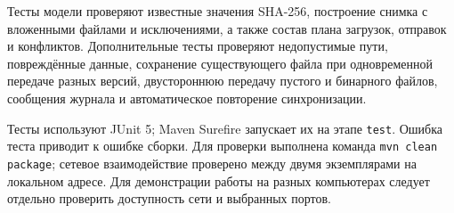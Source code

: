 \documentclass[12pt,a4paper]{article}
\begin{document}
Тесты модели проверяют известные значения SHA-256, построение снимка с вложенными файлами и исключениями, а также состав плана загрузок, отправок и конфликтов. Дополнительные тесты проверяют недопустимые пути, повреждённые данные, сохранение существующего файла при одновременной передаче разных версий, двустороннюю передачу пустого и бинарного файлов, сообщения журнала и автоматическое повторение синхронизации.

Тесты используют JUnit 5; Maven Surefire запускает их на этапе \texttt{test}. Ошибка теста приводит к ошибке сборки. Для проверки выполнена команда \texttt{mvn clean package}; сетевое взаимодействие проверено между двумя экземплярами на локальном адресе. Для демонстрации работы на разных компьютерах следует отдельно проверить доступность сети и выбранных портов.
\end{document}
